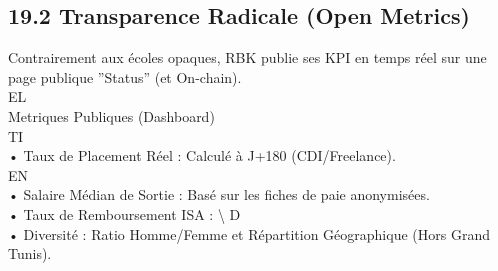 \documentclass[12pt,landscape,a4paper]{article}
\begin{document}
\subsection{19.2 Transparence Radicale (Open Metrics)}
Contrairement aux écoles opaques, RBK publie ses KPI en temps réel sur une page publique ”Status” (et On-chain).\\
\vspace{0.5em}
\vspace{0.5em}
\vspace{0.5em}
\vspace{0.5em}
EL\\
Metriques Publiques (Dashboard)\\
\vspace{0.5em}
\vspace{0.5em}
\vspace{0.5em}
\vspace{0.5em}
TI\\
• Taux de Placement Réel : Calculé à J+180 (CDI/Freelance).\\
\vspace{0.5em}
\vspace{0.5em}
\vspace{0.5em}
\vspace{0.5em}
EN\\
• Salaire Médian de Sortie : Basé sur les fiches de paie anonymisées.\\
\vspace{0.5em}
• Taux de Remboursement ISA : \textbackslash{}%
\vspace{0.5em}
\vspace{0.5em}
\vspace{0.5em}
\vspace{0.5em}
D\\
• Diversité : Ratio Homme/Femme et Répartition Géographique (Hors Grand Tunis).\\
\vspace{0.5em}
\vspace{0.5em}
\vspace{0.5em}
\end{document}

